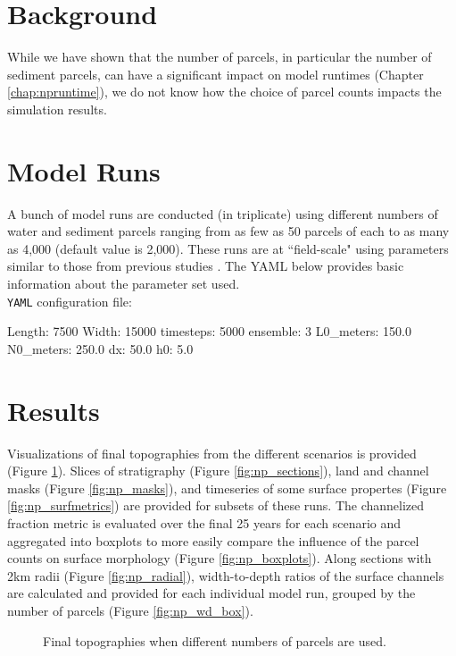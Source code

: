 \section{Background}
While we have shown that the number of parcels, in particular the number of sediment parcels, can have a significant impact on model runtimes (Chapter \ref{chap:npruntime}), we do not know how the choice of parcel counts impacts the simulation results.

\section{Model Runs}
A bunch of model runs are conducted (in triplicate) using different numbers of water and sediment parcels ranging from as few as 50 parcels of each to as many as 4,000 (default value is 2,000).
These runs are at ``field-scale" using parameters similar to those from previous studies \cite{Liang2016, Liang2016a}.
The YAML below provides basic information about the parameter set used.\\

\noindent \texttt{YAML} configuration file: \vspace{-6pt}
\begin{boxedverbatim}
Length: 7500
Width: 15000
timesteps: 5000
ensemble: 3
L0_meters: 150.0
N0_meters: 250.0
dx: 50.0
h0: 5.0
\end{boxedverbatim}

\section{Results}
Visualizations of final topographies from the different scenarios is provided (Figure \ref{fig:np_finaltopos}).
Slices of stratigraphy (Figure \ref{fig:np_sections}), land and channel masks (Figure \ref{fig:np_masks}), and timeseries of some surface propertes (Figure \ref{fig:np_surfmetrics}) are provided for subsets of these runs.
The channelized fraction metric is evaluated over the final 25 years for each scenario and aggregated into boxplots to more easily compare the influence of the parcel counts on surface morphology (Figure \ref{fig:np_boxplots}).
Along sections with 2km radii (Figure \ref{fig:np_radial}), width-to-depth ratios of the surface channels are calculated and provided for each individual model run, grouped by the number of parcels (Figure \ref{fig:np_wd_box}).

\begin{figure}
	\caption{Final topographies when different numbers of parcels are used.}
	\label{fig:np_finaltopos}
\end{figure}

